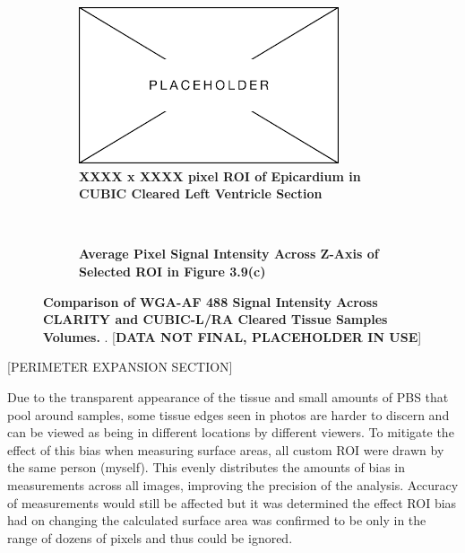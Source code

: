 \begin{figure}[H]
    \begin{subfigure}[t]{0.475\textwidth}
    \centering
    \includegraphics[width=1\linewidth]{Figures/Placeholder.png}
    \caption{\textbf{XXXX x XXXX pixel ROI of Epicardium in CUBIC Cleared Left Ventricle Section}}
    \end{subfigure}
    ~
    \begin{subfigure}[t]{0.475\textwidth}
    \centering
    \caption{\textbf{Average Pixel Signal Intensity Across Z-Axis of Selected ROI in Figure 3.9(c)}}
    \label{fig:enter-label}
    \end{subfigure}
    \medskip

\caption{\textbf{Comparison of WGA-AF 488 Signal Intensity Across CLARITY and CUBIC-L/RA Cleared Tissue Samples Volumes.} . [\textbf{DATA NOT FINAL, PLACEHOLDER IN USE}]}
\label{fig:enter-label}
\end{figure}

[PERIMETER EXPANSION SECTION]

Due to the transparent appearance of the tissue and small amounts of PBS that pool around samples, some tissue edges seen in photos are harder to discern and can be viewed as being in different locations by different viewers. To mitigate the effect of this bias when measuring surface areas, all custom ROI were drawn by the same person (myself). This evenly distributes the amounts of bias in measurements across all images, improving the precision of the analysis. Accuracy of measurements would still be affected but it was determined the effect ROI bias had on changing the calculated surface area was confirmed to be only in the range of dozens of pixels and thus could be ignored.

